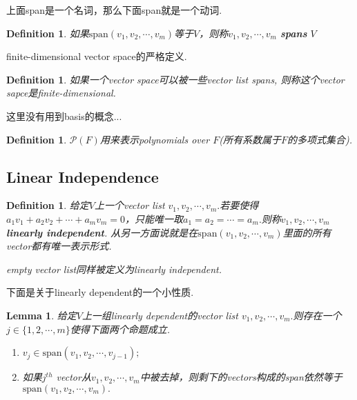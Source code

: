 \documentclass{article}
\newtheorem{lemma}[theorem]{Lemma}
\newtheorem{definition}[theorem]{Definition}
\begin{document}
{\color{red} 上面span是一个名词，那么下面span就是一个动词}.

\begin{definition}
\rm 如果$\text{span}(v_1,v_2,\cdots,v_m)$等于$V$，则称$v_1,v_2,\cdots,v_m$ \textbf{spans} $V$	
\end{definition}

{ \color{red} finite-dimensional vector space的严格定义}.

\begin{definition}
\rm 如果一个vector space可以被一些vector list spans, 则称这个vector sapce是finite-dimensional.
\end{definition}

这里没有用到basis的概念...

\begin{definition}
\rm $\mathcal{P}(F)$用来表示polynomials over $F$(所有系数属于$F$的多项式集合).
\end{definition}



\newpage
\subsection{Linear Independence}

\begin{definition}
\rm 给定$V$上一个vector list $v_1,v_2,\cdots,v_m.$若要使得$a_1v_1+a_2v_2+\cdots+a_mv_m=0$，只能唯一取$a_1=a_2=\cdots=a_m.$则称$v_1,v_2,\cdots,v_m$ \textbf{linearly independent}. 从另一方面说就是在$\text{span}(v_1,v_2,\cdots,v_m)$里面的所有vector都有唯一表示形式.

empty vector list同样被定义为linearly independent.
\end{definition}


{\color{red} 下面是关于linearly dependent的一个小性质}.

\begin{lemma}
\rm 给定$V$上一组linearly dependent的vector list $v_1,v_2,\cdots,v_m.$则存在一个$j \in \{1,2,\cdots,m\}$使得下面两个命题成立.
\begin{enumerate}
	\item $v_j \in \text{span}(v_1,v_2,\cdots,v_{j-1});$
	\item 如果$j^{th}$ vector从$v_1,v_2,\cdots,v_m$中被去掉，则剩下的vectors构成的span依然等于$\text{span}(v_1,v_2,\cdots,v_m).$ 
\end{enumerate}
\end{lemma}
\end{document}
